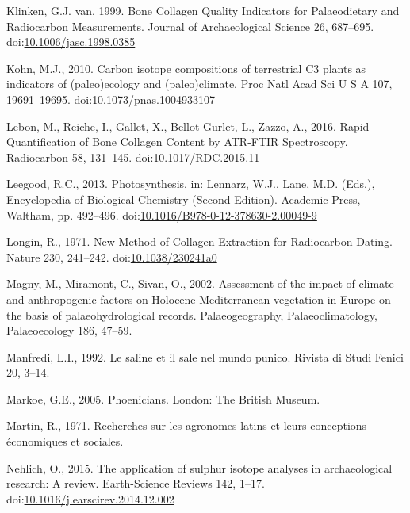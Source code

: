 \documentclass[review]{elsarticle} %
\newlength{\cslhangindent}
\newenvironment{CSLReferences}[2] %
 {%
  \setlength{\parindent}{0pt}
  \ifodd #1 \everypar{\setlength{\hangindent}{\cslhangindent}}\ignorespaces\fi
  \ifnum #2 > 0
  \setlength{\parskip}{#2\baselineskip}
  \fi
 }%
 {}
\begin{document}
\begin{CSLReferences}{1}{0}
\leavevmode{}%
Klinken, G.J. van, 1999. Bone {Collagen Quality Indicators} for {Palaeodietary} and {Radiocarbon Measurements}. Journal of Archaeological Science 26, 687--695. doi:\href{https://doi.org/10.1006/jasc.1998.0385}{10.1006/jasc.1998.0385}

\leavevmode{}%
Kohn, M.J., 2010. Carbon isotope compositions of terrestrial {C3} plants as indicators of (paleo)ecology and (paleo)climate. Proc Natl Acad Sci U S A 107, 19691--19695. doi:\href{https://doi.org/10.1073/pnas.1004933107}{10.1073/pnas.1004933107}

\leavevmode{}%
Lebon, M., Reiche, I., Gallet, X., Bellot-Gurlet, L., Zazzo, A., 2016. Rapid {Quantification} of {Bone Collagen Content} by {ATR}-{FTIR Spectroscopy}. Radiocarbon 58, 131--145. doi:\href{https://doi.org/10.1017/RDC.2015.11}{10.1017/RDC.2015.11}

\leavevmode{}%
Leegood, R.C., 2013. Photosynthesis, in: Lennarz, W.J., Lane, M.D. (Eds.), Encyclopedia of {Biological Chemistry} ({Second Edition}). {Academic Press}, {Waltham}, pp. 492--496. doi:\href{https://doi.org/10.1016/B978-0-12-378630-2.00049-9}{10.1016/B978-0-12-378630-2.00049-9}

\leavevmode{}%
Longin, R., 1971. New {Method} of {Collagen Extraction} for {Radiocarbon Dating}. Nature 230, 241--242. doi:\href{https://doi.org/10.1038/230241a0}{10.1038/230241a0}

\leavevmode{}%
Magny, M., Miramont, C., Sivan, O., 2002. Assessment of the impact of climate and anthropogenic factors on {Holocene Mediterranean} vegetation in {Europe} on the basis of palaeohydrological records. Palaeogeography, Palaeoclimatology, Palaeoecology 186, 47--59.

\leavevmode{}%
Manfredi, L.I., 1992. Le saline et il sale nel mundo punico. Rivista di Studi Fenici 20, 3--14.

\leavevmode{}%
Markoe, G.E., 2005. Phoenicians. {London}: {The British Museum}.

\leavevmode{}%
Martin, R., 1971. Recherches sur les agronomes latins et leurs conceptions économiques et sociales.

\leavevmode{}%
Nehlich, O., 2015. The application of sulphur isotope analyses in archaeological research: {A} review. Earth-Science Reviews 142, 1--17. doi:\href{https://doi.org/10.1016/j.earscirev.2014.12.002}{10.1016/j.earscirev.2014.12.002}


\end{CSLReferences}
\end{document}
